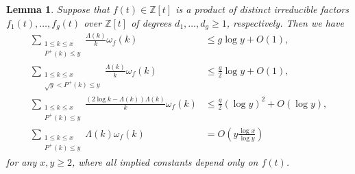 \documentclass[a4paper,11pt]{amsart}
\newtheorem{lemma}[theorem]{Lemma}
\theoremstyle{definition}
\numberwithin{equation}{section}
\begin{document}
\begin{lemma}\label{lem:4.1}
Suppose that $f(t) \in \mathbb{Z}[t]$ is a product of distinct irreducible factors $f_1(t), \ldots, f_g(t)$ over $\mathbb{Z}[t]$ of degrees $d_1, \ldots, d_g \geq1$, respectively. 
Then we have
\begin{align}
\sum_{\substack{1 \leq k \leq x \\ P^+(k) \leq y}} \frac{\Lambda(k)}{k} \omega_f(k)
&\leq g \log{y}+O(1), \label{eq:09292105} \\ 
\sum_{\substack{1 \leq k \leq x \\ \sqrt{y}< P^+(k) \leq y}} \frac{\Lambda(k)}{k} \omega_f(k)
&\leq \frac{g}{2} \log{y}+O(1), \label{eq:09292108} \\ 
\sum_{\substack{1 \leq k \leq x \\ P^+(k) \leq y}} \frac{(2\log{k}-\Lambda(k)) \Lambda(k)}{k} \omega_f(k)
&\leq \frac{g}{2} (\log{y})^2+O(\log{y}), \label{eq:09292106} \\ 
\sum_{\substack{1 \leq k \leq x \\ P^+(k) \leq y}} \Lambda(k) \omega_f(k)
&=O\left(y \frac{\log{x}}{\log{y}}\right) \label{eq:09292107}
\end{align}
for any $x, y \geq2$, where all implied constants depend only on $f(t)$.
\end{lemma}
\end{document}
